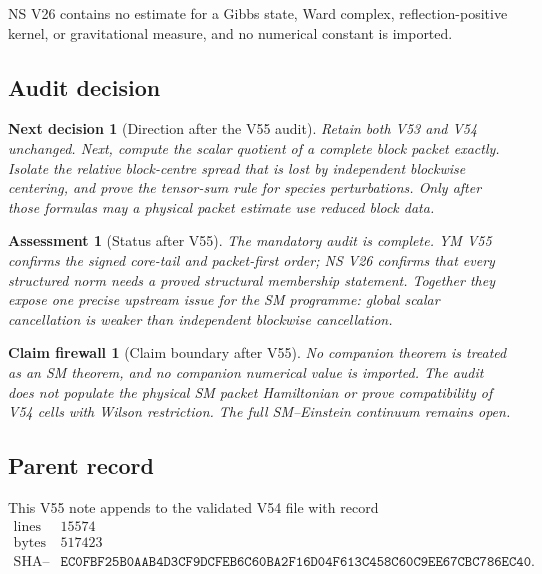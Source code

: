 \documentclass[11pt]{article}
\newtheorem{firewall}[theorem]{Claim firewall}
\newtheorem{decision}[theorem]{Next decision}
\newtheorem{assessment}[theorem]{Assessment}
\theoremstyle{remark}
\begin{document}
NS V26 contains no estimate for a Gibbs state, Ward complex,
reflection-positive kernel, or gravitational measure, and no
numerical constant is imported.

\subsection{Audit decision}

\begin{decision}[Direction after the V55 audit]
\label{dec:v12v55-direction}
Retain both V53 and V54 unchanged.  Next, compute the scalar quotient
of a complete block packet exactly.  Isolate the relative
block-centre spread that is lost by independent blockwise centering,
and prove the tensor-sum rule for species perturbations.  Only after
those formulas may a physical packet estimate use reduced block
data.
\end{decision}

\begin{assessment}[Status after V55]
\label{ass:v12v55-status}
The mandatory audit is complete.  YM V55 confirms the signed
core-tail and packet-first order; NS V26 confirms that every
structured norm needs a proved structural membership statement.
Together they expose one precise upstream issue for the SM
programme: global scalar cancellation is weaker than independent
blockwise cancellation.
\end{assessment}

\begin{firewall}[Claim boundary after V55]
\label{fire:v12v55-claim}
No companion theorem is treated as an SM theorem, and no companion
numerical value is imported.  The audit does not populate the
physical SM packet Hamiltonian or prove compatibility of V54 cells
with Wilson restriction.  The full SM--Einstein continuum remains
open.
\end{firewall}

\subsection{Parent record}

This V55 note appends to the validated V54 file with record
\[
\begin{array}{c|c}
\text{lines}&15574\\
\text{bytes}&517423\\
\text{SHA--256}&
\texttt{EC0FBF25B0AAB4D3CF9DCFEB6C60BA2F16D04F613C458C60C9EE67CBC786EC40}.
\end{array}
\]
\end{document}
